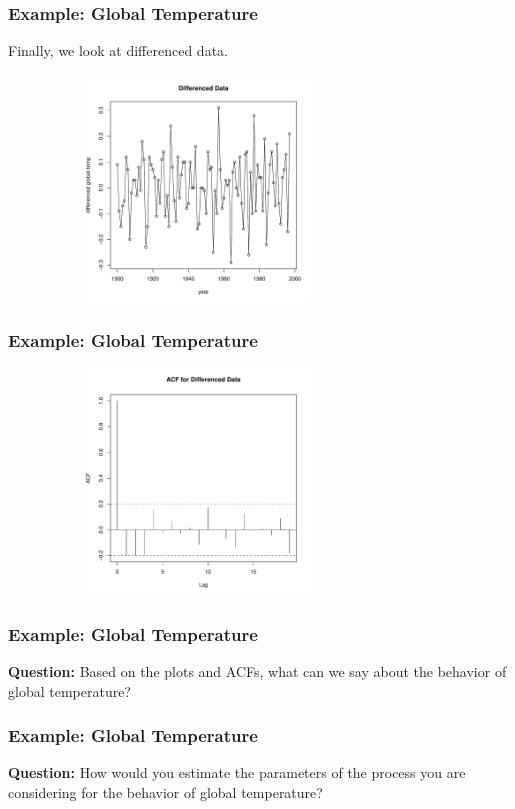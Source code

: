 \documentclass[%
xcolor=pdftex]{beamer}
\begin{document}
\begin{frame}
\frametitle{Example: Global Temperature}

Finally, we look at differenced data.

\includegraphics[width=100mm, height=60mm]{pics/plots3.pdf}

\end{frame}



\begin{frame}
\frametitle{Example: Global Temperature}

\includegraphics[width=100mm, height=60mm]{pics/acf3.pdf}

\end{frame}

\begin{frame}
\frametitle{Example: Global Temperature}

\textbf{Question:} Based on the plots and ACFs, what can we say about the behavior of global temperature?

\vspace{50mm}

\end{frame}

\begin{frame}
\frametitle{Example: Global Temperature}

\textbf{Question:} How would you estimate the parameters of the process you are considering for the behavior of global temperature?

\vspace{50mm}

\end{frame}
\end{document}
